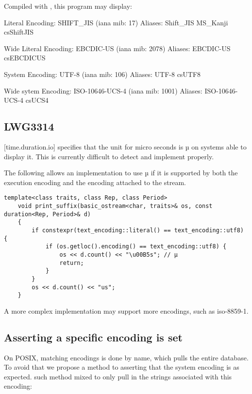 \documentclass{wg21}
\begin{document}
Compiled with , this program may display:

\begin{codeblock}
    Literal Encoding: SHIFT_JIS (iana mib: 17)
    Aliases:
        Shift_JIS
        MS_Kanji
        csShiftJIS
    
    Wide Literal Encoding: EBCDIC-US (iana mib: 2078)
    Aliases:
        EBCDIC-US
        csEBCDICUS
    
    System Encoding: UTF-8 (iana mib: 106)
    Aliases:
        UTF-8
        csUTF8
    
    Wide sytem Encoding: ISO-10646-UCS-4 (iana mib: 1001)
    Aliases:
        ISO-10646-UCS-4
        csUCS4
\end{codeblock}

\subsection{LWG3314}

[time.duration.io] specifies that the unit for micro seconds is µ on systems able to display it.
This is currently difficult to detect and implement properly.

The following allows an implementation to use µ if it is supported by both the execution encoding and the encoding
attached to the stream.


\begin{lstlisting}[style=MY]
    template<class traits, class Rep, class Period>
    void print_suffix(basic_ostream<char, traits>& os, const duration<Rep, Period>& d)
    {
        if constexpr(text_encoding::literal() == text_encoding::utf8) {
            if (os.getloc().encoding() == text_encoding::utf8) {
                os << d.count() << "\u00B5s"; // µ
                return;
            }
        }
        os << d.count() << "us";
    }
\end{lstlisting}

A more complex implementation may support more encodings, such as iso-8859-1.

\subsection{Asserting a specific encoding is set}

On POSIX, matching encodings is done by name, which pulls the entire database.
To avoid that we propose a method to asserting that the system encoding is as expected.
such method mixed to only pull in the strings associated with this encoding:
\end{document}

